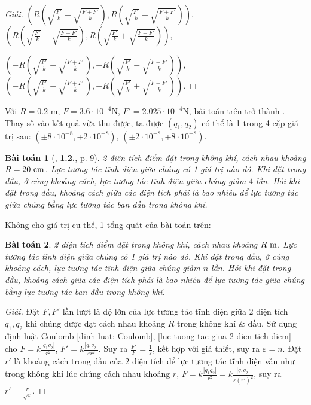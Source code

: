 \documentclass[oneside]{book}
\numberwithin{equation}{section}
\newtheorem{baitoan}{Bài toán}[section]
\begin{document}
\begin{proof}[Giải]
	$\left(R\left(\sqrt{\frac{F'}{k}} + \sqrt{\frac{F + F'}{k}}\right),R\left(\sqrt{\frac{F'}{k}} - \sqrt{\frac{F + F'}{k}}\right)\right)$, $\left(R\left(\sqrt{\frac{F'}{k}} - \sqrt{\frac{F + F'}{k}}\right),R\left(\sqrt{\frac{F'}{k}} + \sqrt{\frac{F + F'}{k}}\right)\right)$,
	
	$\left(-R\left(\sqrt{\frac{F'}{k}} + \sqrt{\frac{F + F'}{k}}\right),-R\left(\sqrt{\frac{F'}{k}} - \sqrt{\frac{F + F'}{k}}\right)\right)$, $\left(-R\left(\sqrt{\frac{F'}{k}} - \sqrt{\frac{F + F'}{k}}\right),-R\left(\sqrt{\frac{F'}{k}} + \sqrt{\frac{F + F'}{k}}\right)\right)$.
\end{proof}
Với $R = 0.2$ m, $F = 3.6\cdot 10^{-4}$N, $F' = 2.025\cdot 10^{-4}$N, bài toán trên trở thành \cite[\textbf{1.1}, p. 7]{Giai_Toan_Vat_Ly_11_tap_1}. Thay số vào kết quả vừa thu được, ta được $(q_1,q_2)$ có thể là 1 trong 4 cặp giá trị sau: $(\pm8\cdot 10^{-8},\mp2\cdot 10^{-8})$, $(\pm2\cdot 10^{-8},\mp8\cdot 10^{-8})$.

\begin{baitoan}[\cite{Giai_Toan_Vat_Ly_11_tap_1}, \textbf{1.2.}, p. 9]
	2 điện tích điểm đặt trong không khí, cách nhau khoảng $R = 20\ {\rm cm}$. Lực tương tác tĩnh điện giữa chúng có 1 giá trị nào đó. Khi đặt trong dầu, ở cùng khoảng cách, lực tương tác tĩnh điện giữa chúng giảm $4$ lần. Hỏi khi đặt trong dầu, khoảng cách giữa các điện tích phải là bao nhiêu để lực tương tác giữa chúng bằng lực tương tác ban đầu trong không khí.
\end{baitoan}
Không cho giá trị cụ thể, 1 tổng quát của bài toán trên:

\begin{baitoan}
	2 điện tích điểm đặt trong không khí, cách nhau khoảng $R\ {\rm m}$. Lực tương tác tĩnh điện giữa chúng có 1 giá trị nào đó. Khi đặt trong dầu, ở cùng khoảng cách, lực tương tác tĩnh điện giữa chúng giảm $n$ lần. Hỏi khi đặt trong dầu, khoảng cách giữa các điện tích phải là bao nhiêu để lực tương tác giữa chúng bằng lực tương tác ban đầu trong không khí.
\end{baitoan}

\begin{proof}[Giải]
	Đặt $F,F'$ lần lượt là độ lớn của lực tương tác tĩnh điện giữa 2 điện tích $q_1,q_2$ khi chúng được đặt cách nhau khoảng $R$ trong không khí \& dầu. Sử dụng định luật Coulomb \ref{dinh luat: Coulomb}, \eqref{luc tuong tac giua 2 dien tich diem} cho $F = k\frac{|q_1q_2|}{r^2}$, $F' = k\frac{|q_1q_2|}{\varepsilon r^2}$. Suy ra $\frac{F'}{F} = \frac{1}{\varepsilon}$, kết hợp với giả thiết, suy ra $\varepsilon = n$. Đặt $r'$ là khoảng cách trong dầu của 2 điện tích để lực tương tác tĩnh điện vẫn như trong không khí lúc chúng cách nhau khoảng $r$, $F = k\frac{|q_1q_2|}{r^2} = k\frac{|q_1q_2|}{\varepsilon(r')^2}$, suy ra $r' = \frac{r}{\sqrt{\varepsilon}}$.
\end{proof}
\end{document}
